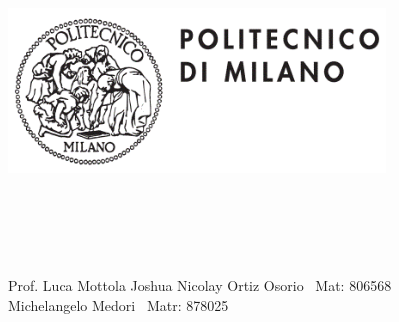 \documentclass{article}
\begin{document}
\includegraphics[width=10cm, height=5cm]{logo} \break \break

\\

  \\
 \\

\break



\break \break

\break





\begin{flushright}


Prof. Luca Mottola\break 
Joshua Nicolay Ortiz Osorio \ Mat: 806568 \\
Michelangelo Medori \ Matr: 878025

\end{flushright}

\newpage
\end{document}
